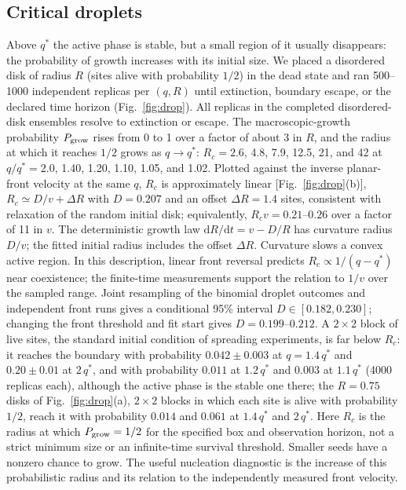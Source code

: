 \documentclass[pre,twocolumn,superscriptaddress,showpacs,floatfix]{revtex4-2}
\newcommand{\qs}{q^{*}}
\newcommand{\ds}{\mathrm{d}}
\begin{document}
\subsection{Critical droplets}
\label{sec:drops}

Above $\qs$ the active phase is stable, but a small region of it usually disappears:
the probability of growth increases with its initial size. We placed a disordered disk of radius $R$
(sites alive with probability $1/2$) in the dead state and ran 500--1000 independent replicas per
$(q,R)$ until extinction, boundary escape, or the declared time horizon
(Fig.~\ref{fig:drop}). All replicas in the completed disordered-disk ensembles resolve
to extinction or escape. The macroscopic-growth probability $P_{\rm grow}$
rises from 0 to 1 over a factor of about 3 in $R$, and the radius at which it reaches
$1/2$ grows as $q\to\qs$: $R_c = 2.6$, 4.8, 7.9, 12.5, 21, and 42 at $q/\qs = 2.0$, 1.40,
1.20, 1.10, 1.05, and 1.02. Plotted against the inverse planar-front velocity at the same $q$,
$R_c$ is approximately linear [Fig.~\ref{fig:drop}(b)], $R_c\simeq D/v + \Delta R$ with $D = 0.207$ and an offset
$\Delta R = 1.4$ sites, consistent with relaxation of the random initial disk; equivalently,
$R_c v = 0.21$--$0.26$ over a factor of 11 in $v$. The deterministic growth
law $\ds R/\ds t = v-D/R$ has curvature radius $D/v$; the fitted initial
radius includes the offset $\Delta R$. Curvature slows a convex active
region. In this
description, linear front reversal predicts $R_c\propto1/(q-\qs)$ near
coexistence; the finite-time measurements support the relation to $1/v$ over
the sampled range. Joint resampling of the binomial droplet outcomes and
independent front runs gives a conditional 95\% interval $D\in[0.182,0.230]$;
changing the front threshold and fit start gives $D=0.199$--$0.212$.
A $2\times2$ block of live sites, the standard initial
condition of spreading experiments, is far below $R_c$: it reaches the boundary with probability
$0.042\pm0.003$ at $q = 1.4\,\qs$ and $0.20\pm0.01$ at $2\,\qs$, and with probability $0.011$ at
$1.2\,\qs$ and $0.003$ at $1.1\,\qs$ (4000 replicas each), although the active phase is the stable
one there; the $R = 0.75$ disks of Fig.~\ref{fig:drop}(a), $2\times2$ blocks in which each site is
alive with probability $1/2$, reach it with probability $0.014$ and $0.061$ at
$1.4\,\qs$ and $2\,\qs$.
Here $R_c$ is the radius at which $P_{\rm grow}=1/2$ for the specified box
and observation horizon, not a strict minimum size or an infinite-time
survival threshold. Smaller seeds have a nonzero chance to grow. The useful
nucleation diagnostic is the increase of this probabilistic radius and its
relation to the independently measured front velocity.
\end{document}
